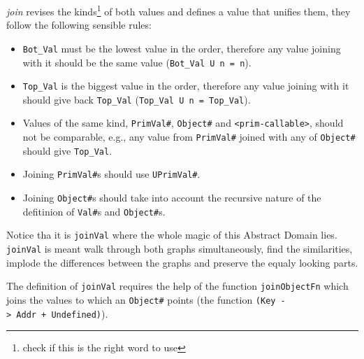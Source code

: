 \documentclass[
11pt, %
english, %
singlespacing, %
headsepline, %
]{MastersDoctoralThesis} %
\providecommand{\tightlist}{%
  \setlength{\itemsep}{0pt}\setlength{\parskip}{0pt}}
\begin{document}
\emph{join} revises the kinds\footnote{check if this is the right word
  to use} of both values and defines a value that unifies them, they
follow the following sensible rules:

\begin{itemize}
\tightlist
\item
  \texttt{Bot\_Val} must be the lowest value in the order, therefore any
  value joining with it should be the same value
  (\texttt{Bot\_Val\ U\ n\ =\ n}).
\item
  \texttt{Top\_Val} is the biggest value in the order, therefore any
  value joining with it should give back \texttt{Top\_Val}
  (\texttt{Top\_Val\ U\ n\ =\ Top\_Val}).
\item
  Values of the same kind, \texttt{PrimVal\#}, \texttt{Object\#} and
  \texttt{\textless{}prim-callable\textgreater{}}, should not be
  comparable, e.g., any value from \texttt{PrimVal\#} joined with any of
  \texttt{Object\#} should give \texttt{Top\_Val}.
\item
  Joining \texttt{PrimVal\#}s should use \texttt{UPrimVal\#}.
\item
  Joining \texttt{Object\#}s should take into account the recursive
  nature of the defitinion of \texttt{Val\#}s and \texttt{Object\#}s.
\end{itemize}

Notice tha it is \texttt{joinVal} where the whole magic of this Abstract
Domain lies. \texttt{joinVal} is meant walk through both graphs
simultaneously, find the similarities, implode the differences between
the graphs and preserve the equaly looking parts.

The definition of \texttt{joinVal} requires the help of the function
\texttt{joinObjectFn} which joins the values to which an
\texttt{Object\#} points (the function
\texttt{(Key\ -\textgreater{}\ Addr\ +\ Undefined)}).
\end{document}
